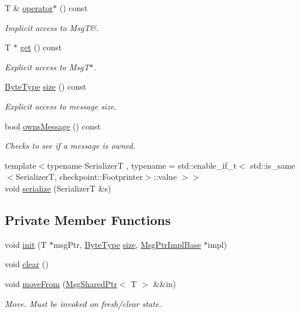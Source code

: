\begin{DoxyCompactItemize}
T \& \hyperlink{structvt_1_1messaging_1_1_msg_shared_ptr_a609cd3703233ec7a0e26db0ff457b8f7}{operator$\ast$} () const
\begin{DoxyCompactList}\small\item\em Implicit access to MsgT\&. \end{DoxyCompactList}\item 
T $\ast$ \hyperlink{structvt_1_1messaging_1_1_msg_shared_ptr_a6e6e25e087e662d9171fa20b5092efdd}{get} () const
\begin{DoxyCompactList}\small\item\em Explicit access to Msg\+T$\ast$. \end{DoxyCompactList}\item 
\hyperlink{namespacevt_aab8d55968084610ce3b17057981e9300}{Byte\+Type} \hyperlink{structvt_1_1messaging_1_1_msg_shared_ptr_a2ed79c214e294d8a15c930ee573f13b9}{size} () const
\begin{DoxyCompactList}\small\item\em Explicit access to message size. \end{DoxyCompactList}\item 
bool \hyperlink{structvt_1_1messaging_1_1_msg_shared_ptr_aea0124e8c6c53e91f3239a8ecf3cdca8}{owns\+Message} () const
\begin{DoxyCompactList}\small\item\em Checks to see if a message is owned. \end{DoxyCompactList}\item 
{\footnotesize template$<$typename SerializerT , typename  = std\+::enable\+\_\+if\+\_\+t$<$      std\+::is\+\_\+same$<$\+Serializer\+T, checkpoint\+::\+Footprinter$>$\+::value    $>$$>$ }\\void \hyperlink{structvt_1_1messaging_1_1_msg_shared_ptr_a604694c988590bdb3a35e403c677cba2}{serialize} (SerializerT \&s)
\end{DoxyCompactItemize}
\subsection*{Private Member Functions}
\begin{DoxyCompactItemize}
\item 
void \hyperlink{structvt_1_1messaging_1_1_msg_shared_ptr_a780631de45b6dfb6812abb9af26cb4e8}{init} (T $\ast$msg\+Ptr, \hyperlink{namespacevt_aab8d55968084610ce3b17057981e9300}{Byte\+Type} \hyperlink{structvt_1_1messaging_1_1_msg_shared_ptr_a2ed79c214e294d8a15c930ee573f13b9}{size}, \hyperlink{structvt_1_1messaging_1_1_msg_ptr_impl_base}{Msg\+Ptr\+Impl\+Base} $\ast$impl)
\item 
void \hyperlink{structvt_1_1messaging_1_1_msg_shared_ptr_ace4439c8585f3d3c50b861570db07d99}{clear} ()
\item 
void \hyperlink{structvt_1_1messaging_1_1_msg_shared_ptr_a351f61999bc2f15ec3027fcb76c9a942}{move\+From} (\hyperlink{structvt_1_1messaging_1_1_msg_shared_ptr}{Msg\+Shared\+Ptr}$<$ T $>$ \&\&in)
\begin{DoxyCompactList}\small\item\em Move. Must be invoked on fresh/clear state. \end{DoxyCompactList}\end{DoxyCompactItemize}
